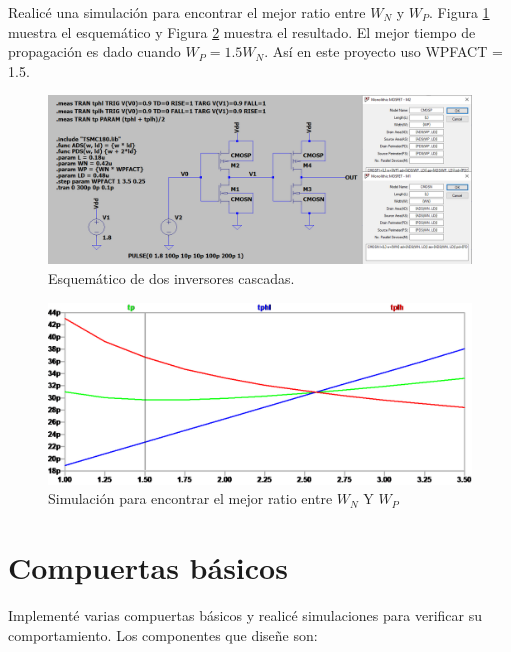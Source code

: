 \documentclass[a4paper]{article}
\begin{document}
Realicé una simulación para encontrar el mejor ratio entre $W_N$ y $W_P$. Figura \ref{fig:wpfact_sch} muestra el esquemático y Figura \ref{fig:wpfact_sim} muestra el resultado. El mejor tiempo de propagación es dado cuando $W_P = 1.5 W_N$. Así en este proyecto uso WPFACT = 1.5.

\begin{figure}[!htb]
\centering
\includegraphics[scale=0.3]{./img/wpfact_sch}
\caption{Esquemático de dos inversores cascadas.}
\label{fig:wpfact_sch}
\end{figure}

\begin{figure}[!htb]
\centering
\includegraphics[scale=0.4]{./img/wpfact_sim}
\caption{Simulación para encontrar el mejor ratio entre $W_N$ Y $W_P$}
\label{fig:wpfact_sim}
\end{figure}

\section{Compuertas básicos}

Implementé varias compuertas básicos y realicé simulaciones para verificar su comportamiento. Los componentes que diseñe son:
\end{document}
